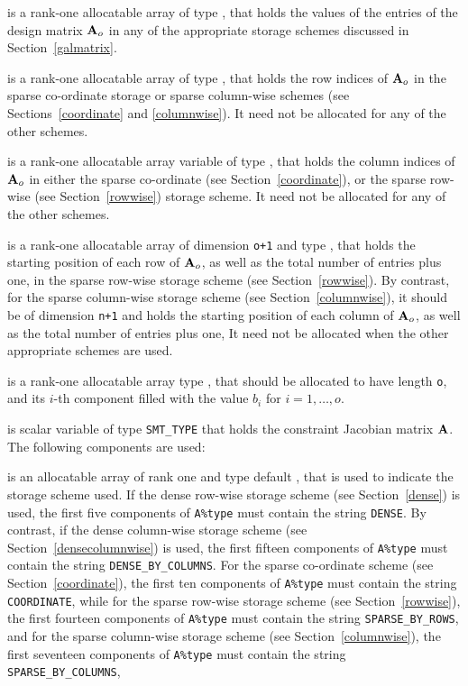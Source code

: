 \documentclass{galahad}
\begin{document}
\begin{description}
\begin{description}
 is a rank-one allocatable array of type \realdp, that
holds the values of the entries of the design matrix ${\mathbf{A}}_o$ in any of the
appropriate storage schemes discussed in Section~\ref{galmatrix}.

 is a rank-one allocatable array of type \integer,
that holds the row indices of ${\mathbf{A}}_o$ in the sparse co-ordinate storage
or sparse column-wise schemes
(see Sections~\ref{coordinate} and \ref{columnwise}).
It need not be allocated for any of the other schemes.

 is a rank-one allocatable array variable of type \integer,
that holds the column indices of ${\mathbf{A}}_o$ in either the sparse co-ordinate
(see Section~\ref{coordinate}), or the sparse row-wise
(see Section~\ref{rowwise}) storage scheme.
It need not be allocated for any of the other schemes.

 is a rank-one allocatable array of dimension {\tt o+1} and type
\integer, that holds the starting position of each row of ${\mathbf{A}}_o$,
as well as the total number of entries plus one,
in the sparse row-wise storage scheme (see Section~\ref{rowwise}).
By contrast, for the sparse column-wise storage scheme
(see Section~\ref{columnwise}), it should be of dimension {\tt n+1}
and holds the starting position of each column of ${\mathbf{A}}_o$,
as well as the total number of entries plus one,
It need not be allocated when the other appropriate schemes are used.

\end{description}

 is a rank-one allocatable array type \realdp, that
should be allocated to have length {\tt o}, and its $i$-th component
filled with the value $b_{i}$ for $i = 1, \ldots , o$.

 is scalar variable of type {\tt SMT\_TYPE}
that holds the constraint Jacobian matrix ${\mathbf{A}}$.
The following components are used:

\begin{description}

 is an allocatable array of rank one and type default \character,
that is used to indicate the storage scheme used.
If the dense row-wise storage scheme (see Section~\ref{dense}) is used,
the first five components of {\tt A\%type} must contain the
string {\tt DENSE}.
By contrast, if the dense column-wise storage scheme
(see Section~\ref{densecolumnwise}) is used,
the first fifteen components of {\tt A\%type} must contain the
string {\tt DENSE\_BY\_COLUMNS}.
For the sparse co-ordinate scheme (see Section~\ref{coordinate}),
the first ten components of {\tt A\%type} must contain the
string {\tt COORDINATE}, while
for the sparse row-wise storage scheme (see Section~\ref{rowwise}),
the first fourteen components of {\tt A\%type} must contain the
string {\tt SPARSE\_BY\_ROWS},
and for the sparse column-wise storage scheme (see Section~\ref{columnwise}),
the first seventeen components of {\tt A\%type} must contain the
string {\tt SPARSE\_BY\_COLUMNS},


\end{description}
\end{description}
\end{document}
